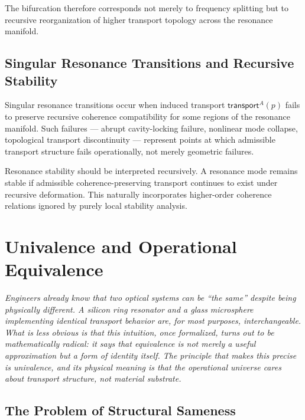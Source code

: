 \documentclass[11pt,openany]{book}
\theoremstyle{definition}
\theoremstyle{plain}
\newcommand{\transport}{\mathsf{transport}}
\begin{document}
The bifurcation therefore corresponds not merely to frequency splitting but to recursive reorganization of higher transport topology across the resonance manifold.

\section{Singular Resonance Transitions and Recursive Stability}

Singular resonance transitions occur when induced transport $\transport^A(p)$ fails to preserve recursive coherence compatibility for some regions of the resonance manifold. Such failures --- abrupt cavity-locking failure, nonlinear mode collapse, topological transport discontinuity --- represent points at which admissible transport structure fails operationally, not merely geometric failures.

Resonance stability should be interpreted recursively. A resonance mode remains stable if admissible coherence-preserving transport continues to exist under recursive deformation. This naturally incorporates higher-order coherence relations ignored by purely local stability analysis.


\chapter{Univalence and Operational Equivalence}

\noindent\textit{Engineers already know that two optical systems can be ``the same'' despite being physically different. A silicon ring resonator and a glass microsphere implementing identical transport behavior are, for most purposes, interchangeable. What is less obvious is that this intuition, once formalized, turns out to be mathematically radical: it says that equivalence is not merely a useful approximation but a form of identity itself. The principle that makes this precise is univalence, and its physical meaning is that the operational universe cares about transport structure, not material substrate.}

\bigskip

\section{The Problem of Structural Sameness}
\end{document}
